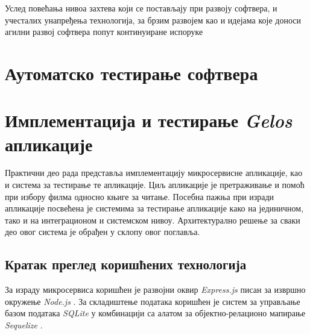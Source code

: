 \documentclass[12pt,oneside]{memoir}
\begin{document}



Услед повећања нивоа захтева који се постављају при развоју софтвера, и учесталих унапређења технологија, 
за брзим развојем као и идејама које доноси агилни развој софтвера попут континуиране испоруке 

\chapter{Аутоматско тестирање софтвера}
\label{chp:testiranje}

\chapter{Имплементација и тестирање \textit{Gelos} апликације}
\label{chp:aplikacija}
Практични део рада представља имплементацију микросервисне апликације, као и система за тестирање те апликације. Циљ апликације је претраживање и помоћ при избору филма односно књиге за читање. Посебна пажња при изради апликације посвећена је системима за тестирање апликације како на јединичном, тако и на интеграционом и системском нивоу. Архитектурално решење за сваки део овог система је обрађен у склопу овог поглавља.

\section{Кратак преглед коришћених технологија}
\label{chp:tehnologije}

За израду микросервиса коришћен је развојни оквир \textit{Express.js} \cite{express} писан за извршно окружење \textit{Node.js} \cite{nodejs}. За складиштење података коришћен је систем за управљање базом података \textit{SQLite} \cite{sqlite} у комбинацији са алатом за објектно-релационо мапирање \textit{Sequelize} \cite{sequelize}. 
\end{document}
